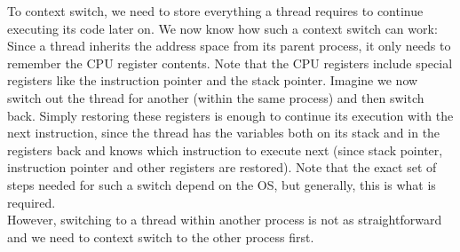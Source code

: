 \documentclass[main]{subfiles}
\begin{document}
To context switch, we need to store everything a thread requires to continue executing its code later on. We now know how such a context switch can work: Since a thread inherits the address space from its parent process, it only needs to remember the CPU register contents. Note that the CPU registers include special registers like the instruction pointer and the stack pointer. Imagine we now switch out the thread for another (within the same process) and then switch back. Simply restoring these registers is enough to continue its execution with the next instruction, since the thread has the variables both on its stack and in the registers back and knows which instruction to execute next (since stack pointer, instruction pointer and other registers are restored). Note that the exact set of steps needed for such a switch depend on the OS, but generally, this is what is required.\\[3mm]
However, switching to a thread within another process is not as straightforward and we need to context switch to the other process first.

\end{document}
